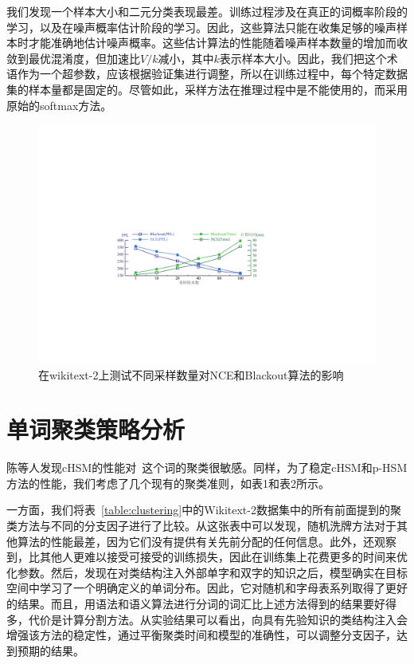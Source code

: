 我们发现一个样本大小和二元分类表现最差。训练过程涉及在真正的词概率阶段的学习，以及在噪声概率估计阶段的学习。因此，这些算法只能在收集足够的噪声样本时才能准确地估计噪声概率。这些估计算法的性能随着噪声样本数量的增加而收敛到最优混淆度，但加速比$ V / k $减小，其中$ k $表示样本大小。因此，我们把这个术语作为一个超参数，应该根据验证集进行调整，所以在训练过程中，每个特定数据集的样本量都是固定的。尽管如此，采样方法在推理过程中是不能使用的，而采用原始的softmax方法。
\begin{figure}[!ht]
  \centering
  \includegraphics[width=0.9\columnwidth]{./figures/nce_blackout.pdf}
  \caption{在wikitext-2上测试不同采样数量对NCE和Blackout算法的影响}\label{fig:blackout_nce}
\end{figure}

\section{单词聚类策略分析}
陈等人发现cHSM的性能对~这个词的聚类很敏感。同样，为了稳定cHSM和p-HSM方法的性能，我们考虑了几个现有的聚类准则，如表1和表2所示。


一方面，我们将表~\ref{table:clustering}中的Wikitext-2数据集中的所有前面提到的聚类方法与不同的分支因子进行了比较。从这张表中可以发现，随机洗牌方法对于其他算法的性能最差，因为它们没有提供有关先前分配的任何信息。此外，还观察到，比其他人更难以接受可接受的训练损失，因此在训练集上花费更多的时间来优化参数。然后，发现在对类结构注入外部单字和双字的知识之后，模型确实在目标空间中学习了一个明确定义的单词分布。因此，它对随机和字母表系列取得了更好的结果。而且，用语法和语义算法进行分词的词汇比上述方法得到的结果要好得多，代价是计算分割方法。从实验结果可以看出，向具有先验知识的类结构注入会增强该方法的稳定性，通过平衡聚类时间和模型的准确性，可以调整分支因子，达到预期的结果。



